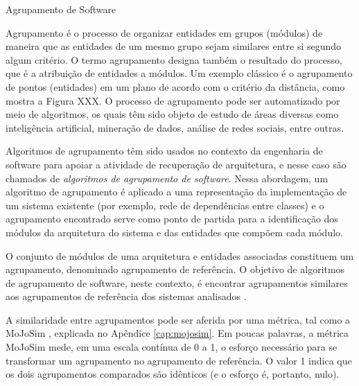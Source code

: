 \begin{section}{Agrupamento de Software}
	
Agrupamento é o processo de organizar entidades em grupos (módulos) de maneira que as entidades de um mesmo grupo sejam similares entre si segundo algum critério. O termo agrupamento designa também o resultado do processo, que é a atribuição de entidades a módulos. Um exemplo clássico é o agrupamento de pontos (entidades) em um plano de acordo com o critério da distância, como mostra a Figura XXX. O processo de agrupamento pode ser automatizado por meio de algoritmos, os quais têm sido objeto de estudo de áreas diversas como inteligência artificial, mineração de dados, análise de redes sociais, entre outras.


Algoritmos de agrupamento têm sido usados no contexto da engenharia de software para apoiar a atividade de recuperação de arquitetura, e nesse caso são chamados de \emph{algoritmos de agrupamento de software}. Nessa abordagem, um algoritmo de agrupamento é aplicado a uma representação da implementação de um sistema existente (por exemplo, rede de dependências entre classes) e o agrupamento encontrado serve como ponto de partida para a identificação dos módulos da arquitetura do sistema e das entidades que compõem cada módulo. 

O conjunto de módulos de uma arquitetura e entidades associadas constituem um agrupamento, denominado agrupamento de referência. O objetivo de algoritmos de agrupamento de software, neste contexto, é encontrar agrupamentos similares aos agrupamentos de referência dos sistemas analisados \cite{Koschke2000}. 

A similaridade entre agrupamentos pode ser aferida por uma métrica, tal como a MoJoSim \cite{Tzerpos1999,Bittencourt2009}, explicada no Apêndice \ref{cap:mojosim}. Em poucas palavras, a métrica MoJoSim mede, em uma escala contínua de 0 a 1, o esforço necessário para se transformar um agrupamento no agrupamento de referência. O valor 1 indica que os dois agrupamentos comparados são idênticos (e o esforço é, portanto, nulo).


\end{section}

